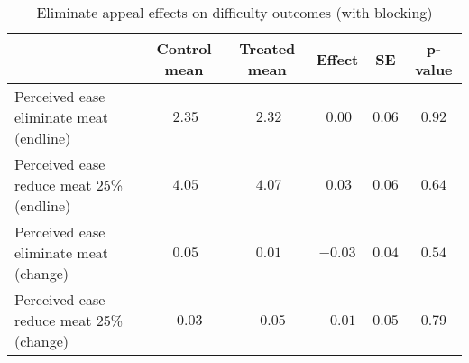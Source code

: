 \begin{table*}[ht]
\caption{Eliminate appeal effects on difficulty outcomes (with blocking)\label{round}} 
\begin{center}
\begin{tabular}{lccccc}
\hline\hline
\multicolumn{1}{l}{}&\multicolumn{1}{c}{Control mean}&\multicolumn{1}{c}{Treated mean}&\multicolumn{1}{c}{Effect}&\multicolumn{1}{c}{SE}&\multicolumn{1}{c}{p-value}\tabularnewline
\hline
Perceived ease eliminate meat (endline)&$~2.35$&$~2.32$&$~0.00$&$0.06$&$0.92$\tabularnewline
Perceived ease reduce meat 25\% (endline)&$~4.05$&$~4.07$&$~0.03$&$0.06$&$0.64$\tabularnewline
Perceived ease eliminate meat (change)&$~0.05$&$~0.01$&$-0.03$&$0.04$&$0.54$\tabularnewline
Perceived ease reduce meat 25\% (change)&$-0.03$&$-0.05$&$-0.01$&$0.05$&$0.79$\tabularnewline
\hline
\end{tabular}\end{center}

\end{table*}
